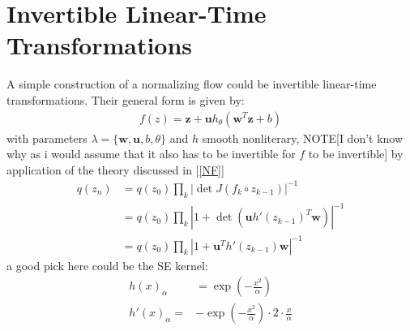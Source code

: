 \section{Invertible Linear-Time Transformations}
A simple construction of a normalizing flow could be invertible linear-time transformations. Their general form is given by:
\begin{align*}
    f(z)=\mathbf{z}+\mathbf{u}h_\theta(\mathbf{w}^T\mathbf{z}+b)
\end{align*}
with parameters $\lambda=\{\mathbf{w},\mathbf{u},b,\theta\}$ and $h$ smooth nonliterary, NOTE[I don't know why as i would assume that it also has to be invertible for $f$ to be invertible] 
by application of the theory discussed in [\ref{NF}]
\begin{align*}
    q(z_n) & =q(z_0)\prod_k|\det J(f_k \circ z_{k-1})|^{-1}\\
    & = q(z_0)\prod_k|1+\det (\mathbf{u}h'(z_{k-1})^T\mathbf{w})|^{-1}\\
    & = q(z_0)\prod_k|1+ \mathbf{u}^Th'(z_{k-1})\mathbf{w}|^{-1}
\end{align*}
a good pick here could be the SE kernel:
\begin{align*}
    h(x)_\alpha & =\exp(-\frac{x^2}{\alpha})\\
    h'(x)_\alpha= & -\exp(-\frac{x^2}{\alpha}) \cdot 2 \cdot \frac{x}{\alpha}
\end{align*}

